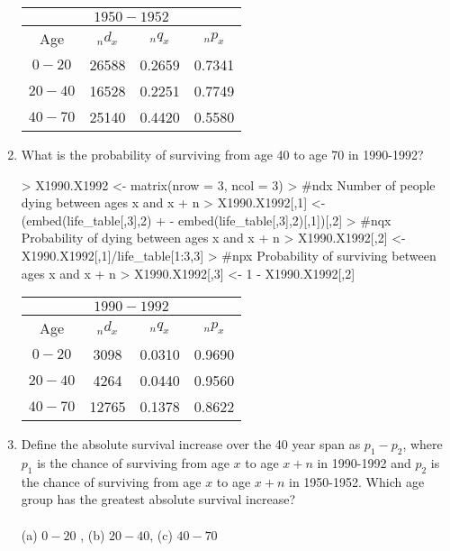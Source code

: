 \documentclass{article}
\begin{document}
\begin{enumerate}
\begin{table}[ht]
\begin{center}
\begin{tabular}{cccc}
\multicolumn{4}{c}{\(1950-1952\)}\\
  \hline
Age & \(_nd_x\) & \(_nq_x\) & \(_np_x\) \\ 
  \hline
\(0-20\) & 26588& 0.2659 & 0.7341 \\ 
\(20-40\) & 16528 & 0.2251 & 0.7749 \\ 
\(40-70\) & 25140 & 0.4420 & 0.5580 \\ 
   \hline
\end{tabular}
\end{center}
\end{table}
\pagebreak
  \item What is the probability of surviving from age 40 to age 70 in 1990-1992?
\begin{Schunk}
\begin{Sinput}
> X1990.X1992 <- matrix(nrow = 3, ncol = 3)
> #ndx Number of people dying between ages x and x + n
> X1990.X1992[,1] <- (embed(life_table[,3],2) 
+                     - embed(life_table[,3],2)[,1])[,2]
> #nqx Probability of dying between ages x and x + n
> X1990.X1992[,2] <- X1990.X1992[,1]/life_table[1:3,3]
> #npx Probability of surviving between ages x and x + n
> X1990.X1992[,3] <- 1 - X1990.X1992[,2]
\end{Sinput}
\end{Schunk}
\begin{table}[ht]
\begin{center}
\begin{tabular}{cccc}
\multicolumn{4}{c}{\(1990-1992\)}\\
  \hline
Age & \(_nd_x\) & \(_nq_x\) & \(_np_x\) \\ 
  \hline
\(0-20\) & 3098 & 0.0310 & 0.9690 \\ 
\(20-40\) & 4264 & 0.0440 & 0.9560 \\ 
\(40-70\) & 12765 & 0.1378 & 0.8622 \\ 
   \hline
\end{tabular}
\end{center}
\end{table}




  \item Define the absolute survival increase over the 40 year span as \(p_1 - p_2\), where \(p_1\) is the chance of surviving from age \(x\) to age \(x+n\) in 1990-1992 and \(p_2\) is the chance of  surviving from age \(x\) to age \(x+n\) in 1950-1952. Which age group has the greatest absolute survival increase?\\\\
(a) \(0 - 20\) , (b) \(20 - 40\), (c) \(40 -70\)\\


\end{enumerate}
\end{document}
